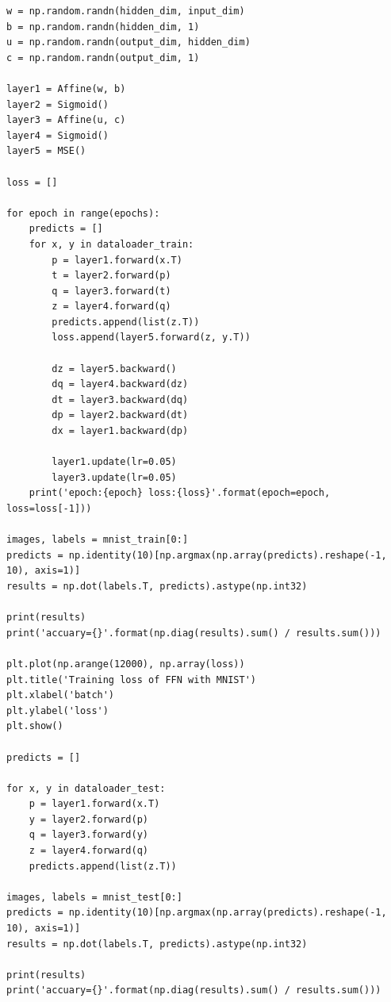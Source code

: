 \documentclass[11pt, a4paper]{jsarticle}
\begin{document}
\begin{lstlisting}[basicstyle=\small, caption=Exercise~3.5, label=src:exercise3.5]
w = np.random.randn(hidden_dim, input_dim)
b = np.random.randn(hidden_dim, 1)
u = np.random.randn(output_dim, hidden_dim)
c = np.random.randn(output_dim, 1)

layer1 = Affine(w, b)
layer2 = Sigmoid()
layer3 = Affine(u, c)
layer4 = Sigmoid()
layer5 = MSE()

loss = []

for epoch in range(epochs):
    predicts = []
    for x, y in dataloader_train:
        p = layer1.forward(x.T)
        t = layer2.forward(p)
        q = layer3.forward(t)
        z = layer4.forward(q)
        predicts.append(list(z.T))
        loss.append(layer5.forward(z, y.T))

        dz = layer5.backward()
        dq = layer4.backward(dz)
        dt = layer3.backward(dq)
        dp = layer2.backward(dt)
        dx = layer1.backward(dp)

        layer1.update(lr=0.05)
        layer3.update(lr=0.05)
    print('epoch:{epoch} loss:{loss}'.format(epoch=epoch, loss=loss[-1]))

images, labels = mnist_train[0:]
predicts = np.identity(10)[np.argmax(np.array(predicts).reshape(-1, 10), axis=1)]
results = np.dot(labels.T, predicts).astype(np.int32)

print(results)
print('accuary={}'.format(np.diag(results).sum() / results.sum()))

plt.plot(np.arange(12000), np.array(loss))
plt.title('Training loss of FFN with MNIST')
plt.xlabel('batch')
plt.ylabel('loss')
plt.show()

predicts = []

for x, y in dataloader_test:
    p = layer1.forward(x.T)
    y = layer2.forward(p)
    q = layer3.forward(y)
    z = layer4.forward(q)
    predicts.append(list(z.T))

images, labels = mnist_test[0:]
predicts = np.identity(10)[np.argmax(np.array(predicts).reshape(-1, 10), axis=1)]
results = np.dot(labels.T, predicts).astype(np.int32)

print(results)
print('accuary={}'.format(np.diag(results).sum() / results.sum()))
  \end{lstlisting}
\end{document}
